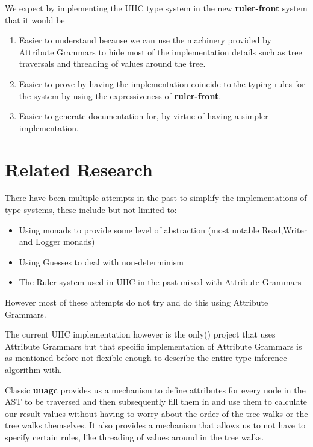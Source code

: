 \documentclass[12pt, a4paper, oneside]{article}
\begin{document}
We expect by implementing the UHC type system in the new \textbf{ruler-front} system that it would be

\begin{enumerate}
\item Easier to understand because we can use the machinery provided by Attribute Grammars to hide most of the implementation details such as tree traversals and threading of values around the tree.
\item Easier to prove by having the implementation coincide to the typing rules for the system by using the expressiveness of \textbf{ruler-front}.
\item Easier to generate documentation for, by virtue of having a simpler implementation.
\end{enumerate}

\section{Related Research}
There have been multiple attempts in the past to simplify the implementations of type systems, these include but not limited to:

\begin{itemize}
\item Using monads\cite{Monads} to provide some level of abstraction (most notable Read,Writer and Logger monads)
\item Using Guesses\cite{Guesses} to deal with non-determinism
\item The Ruler\cite{Ruler} system used in UHC in the past mixed with Attribute Grammars
\end{itemize}

However most of these attempts do not try and do this using Attribute Grammars.

The current UHC implementation however is the only(\cite{UHC}) project that uses Attribute Grammars but that specific implementation of Attribute Grammars is as mentioned before not flexible enough to describe the entire type inference algorithm with.

Classic \textbf{uuagc} provides us a mechanism to define attributes for every node in the AST to be traversed and then subsequently fill them in and use them to calculate our result values without having to worry about the order of the tree walks or the tree walks themselves. It also provides a mechanism that allows us to not have to specify certain rules, like threading of values around in the tree walks.
\end{document}
